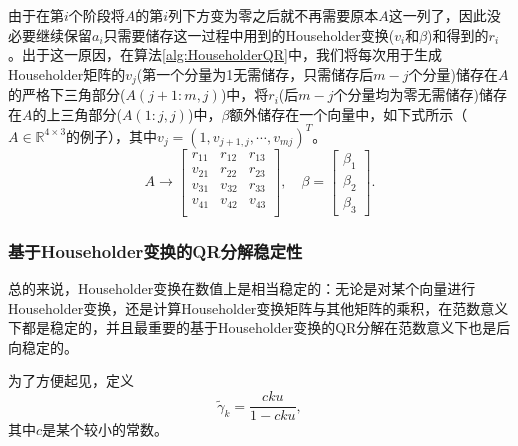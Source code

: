 \documentclass[a4paper,10pt]{ctexart}
\begin{document}
由于在第$ i $个阶段将$ A $的第$ i $列下方变为零之后就不再需要原本$ A $这一列了，因此没必要继续保留$ a_i $只需要储存这一过程中用到的Householder变换($ v_i $和$ \beta $)和得到的$ r_i $。出于这一原因，在算法\ref{alg:HouseholderQR}中，我们将每次用于生成Householder矩阵的$ v_j $(第一个分量为1无需储存，只需储存后$ m-j $个分量)储存在$ A $的严格下三角部分($ A(j+1:m,j) $)中，将$ r_i $(后$ m-j $个分量均为零无需储存)储存在$ A $的上三角部分($ A(1:j,j) $)中，$ \beta $额外储存在一个向量中，如下式所示（$ A\in \mathbb{R}^{4\times 3} $的例子），其中$ v_j = (1, v_{j+1,j},\cdots ,v_{mj})^T $。
\[
    A\longrightarrow
    \begin{bmatrix} 
        r_{11} & r_{12} & r_{13}\\
        v_{21} & r_{22} & r_{23}\\  
        v_{31} & v_{32} & r_{33}\\
        v_{41} & v_{42} & v_{43}\\
    \end{bmatrix},
    \quad \beta =
    \begin{bmatrix}
        \beta_1\\
        \beta_2\\
        \beta_3
    \end{bmatrix}.
\]

\subsubsection{基于Householder变换的QR分解稳定性}
总的来说，Householder变换在数值上是相当稳定的：无论是对某个向量进行Householder变换，还是计算Householder变换矩阵与其他矩阵的乘积，在范数意义下都是稳定的，并且最重要的基于Householder变换的QR分解在范数意义下也是后向稳定的。

为了方便起见，定义
\[
    \tilde{\gamma}_k = \frac{cku}{1-cku},
\]
其中$ c $是某个较小的常数。
\end{document}

